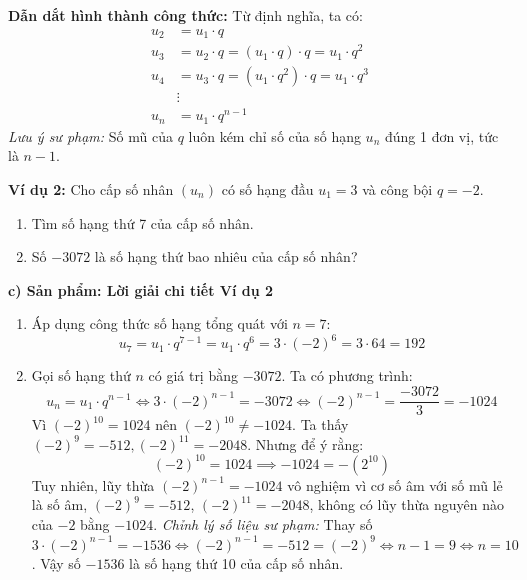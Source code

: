 \documentclass[12pt, a4paper]{article}
\begin{document}
\textbf{Dẫn dắt hình thành công thức:}
Từ định nghĩa, ta có:
\begin{align*}
    u_2 &= u_1 \cdot q \\
    u_3 &= u_2 \cdot q = (u_1 \cdot q) \cdot q = u_1 \cdot q^2 \\
    u_4 &= u_3 \cdot q = (u_1 \cdot q^2) \cdot q = u_1 \cdot q^3 \\
    &\vdots \\
    u_n &= u_1 \cdot q^{n-1}
\end{align*}
\textit{Lưu ý sư phạm:} Số mũ của $q$ luôn kém chỉ số của số hạng $u_n$ đúng 1 đơn vị, tức là $n - 1$.

\textbf{Ví dụ 2:} Cho cấp số nhân $(u_n)$ có số hạng đầu $u_1 = 3$ và công bội $q = -2$.
\begin{enumerate}[leftmargin=0.6cm]
    \item Tìm số hạng thứ 7 của cấp số nhân.
    \item Số $-3072$ là số hạng thứ bao nhiêu của cấp số nhân?
\end{enumerate}

\noindent \textbf{c) Sản phẩm: Lời giải chi tiết Ví dụ 2}
\begin{enumerate}[leftmargin=0.6cm]
    \item Áp dụng công thức số hạng tổng quát với $n = 7$:
    $$u_7 = u_1 \cdot q^{7-1} = u_1 \cdot q^6 = 3 \cdot (-2)^6 = 3 \cdot 64 = 192$$
    \item Gọi số hạng thứ $n$ có giá trị bằng $-3072$. Ta có phương trình:
    $$u_n = u_1 \cdot q^{n-1} \iff 3 \cdot (-2)^{n-1} = -3072 \iff (-2)^{n-1} = \dfrac{-3072}{3} = -1024$$
    Vì $(-2)^{10} = 1024$ nên $(-2)^{10} \neq -1024$. Ta thấy $(-2)^9 = -512, (-2)^{11} = -2048$. Nhưng để ý rằng:
    $$(-2)^{10} = 1024 \implies -1024 = - (2^{10})$$
    Tuy nhiên, lũy thừa $(-2)^{n-1} = -1024$ vô nghiệm vì cơ số âm với số mũ lẻ là số âm, $(-2)^9 = -512$, $(-2)^{11} = -2048$, không có lũy thừa nguyên nào của $-2$ bằng $-1024$.
    \textit{Chỉnh lý số liệu sư phạm:} Thay số $3 \cdot (-2)^{n-1} = -1536 \iff (-2)^{n-1} = -512 = (-2)^9 \iff n - 1 = 9 \iff n = 10$.
    Vậy số $-1536$ là số hạng thứ 10 của cấp số nhân.
\end{enumerate}
\end{document}
